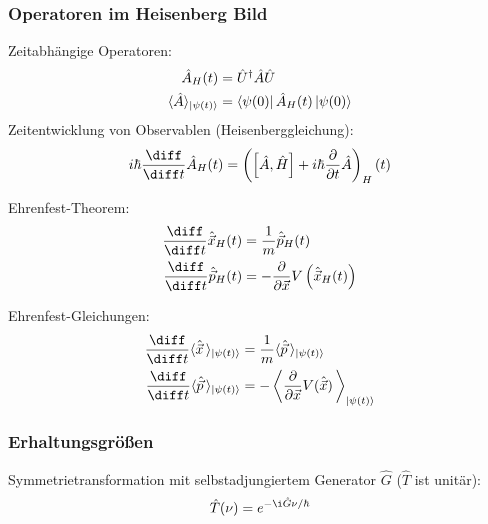 \documentclass[11pt]{article}
\numberwithin{equation}{section}
\begin{document}
      \subsubsection{Operatoren im Heisenberg Bild}
        Zeitabhängige Operatoren:
        \begin{equation}
          \begin{aligned}
            \hat{A}_H(t) &= \hat{U}^\dagger \hat{A} \hat{U} \\
            \langle \hat{A} \rangle_{\Ket{\psi(t)}} &= \Bra{\psi(0)}\hat{A}_H(t)\Ket{\psi(0)}
          \end{aligned}
        \end{equation}
        Zeitentwicklung von Observablen (Heisenberggleichung):
        \begin{equation}
          i\hbar \tder{}{t} \hat{A}_H(t) = \left(\left[\hat{A}, \hat{H}\right] + i\hbar \pder{}{t} \hat{A}\right)_H (t)
        \end{equation}

        Ehrenfest-Theorem:
        \begin{equation}
          \begin{aligned}
            \tder{}{t} \hat{\vec{x}}_H(t) &= \frac{1}{m}\hat{\vec{p}}_H(t) \\
            \tder{}{t} \hat{\vec{p}}_H(t) &= - \pder{}{\vec{x}} V \left(\hat{\vec{x}}_H(t)\right) \\
          \end{aligned}
        \end{equation}

        Ehrenfest-Gleichungen:
        \begin{equation}
          \begin{aligned}
            \tder{}{t} \langle \hat{\vec{x}} \,\rangle_{\Ket{\psi(t)}} &= \frac{1}{m} \langle \hat{\vec{p}} \,\rangle_{\Ket{\psi(t)}} \\
            \tder{}{t} \langle \hat{\vec{p}} \,\rangle_{\Ket{\psi(t)}} &= - \left\langle \pder{}{\vec{x}} V(\hat{\vec{x}}) \,\right\rangle_{\Ket{\psi(t)}} \\
          \end{aligned}
        \end{equation}

      \subsubsection{Erhaltungsgrößen}
        Symmetrietransformation mit selbstadjungiertem Generator $\hat{G}$ ($\hat{T}$ ist unitär):
        \begin{equation}
          \hat{T}(\nu) = e^{-\i\hat{G}\nu/\hbar}
        \end{equation}
\end{document}
